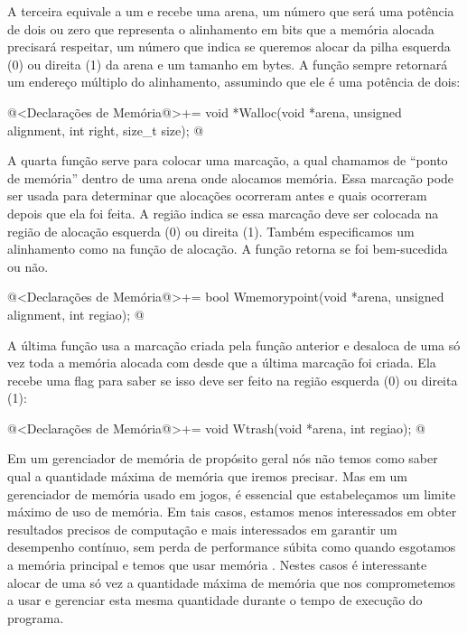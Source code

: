 A terceira equivale a um  e recebe uma arena, um
número que será uma potência de dois ou zero que representa o
alinhamento em bits que a memória alocada precisará respeitar, um
número que indica se queremos alocar da pilha esquerda (0) ou direita
(1) da arena e um tamanho em bytes. A função sempre retornará um
endereço múltiplo do alinhamento, assumindo que ele é uma potência
de dois:

\iniciocodigo
@<Declarações de Memória@>+=
void *Walloc(void *arena, unsigned alignment, int right, size_t size);
@
\fimcodigo

A quarta função serve para colocar uma marcação, a qual chamamos de
``ponto de memória'' dentro de uma arena onde alocamos memória. Essa
marcação pode ser usada para determinar que alocações ocorreram antes
e quais ocorreram depois que ela foi feita. A região indica se essa
marcação deve ser colocada na região de alocação esquerda (0) ou
direita (1). Também especificamos um alinhamento como na função de
alocação. A função retorna se foi bem-sucedida ou não.

\iniciocodigo
@<Declarações de Memória@>+=
bool Wmemorypoint(void *arena, unsigned alignment, int regiao);
@
\fimcodigo

A última função usa a marcação criada pela função anterior e desaloca
de uma só vez toda a memória alocada com  desde que
a última marcação foi criada. Ela recebe uma flag para saber se isso
deve ser feito na região esquerda (0) ou direita (1):

\iniciocodigo
@<Declarações de Memória@>+=
void Wtrash(void *arena, int regiao);
@
\fimcodigo



Em um gerenciador de memória de propósito geral nós não temos como
saber qual a quantidade máxima de memória que iremos precisar. Mas em
um gerenciador de memória usado em jogos, é essencial que
estabeleçamos um limite máximo de uso de memória. Em tais casos,
estamos menos interessados em obter resultados precisos de computação
e mais interessados em garantir um desempenho contínuo, sem perda de
performance súbita como quando esgotamos a memória principal e temos
que usar memória . Nestes casos é interessante alocar de
uma só vez a quantidade máxima de memória que nos comprometemos a usar
e gerenciar esta mesma quantidade durante o tempo de execução do
programa.

